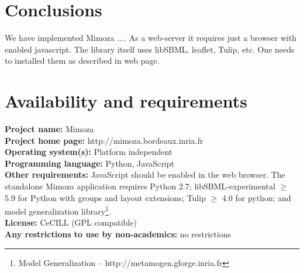 \documentclass{bmcart}
\begin{document}

\section*{Conclusions}
We have implemented Mimoza .... As a web-server it requires just a browser with enabled javascript. The library itself uses libSBML, leaflet, Tulip, etc. One needs to installed them as described in web page.


\section*{Availability and requirements}
\textbf{Project name:} Mimoza\\
\textbf{Project home page:} http://mimoza.bordeaux.inria.fr\\
\textbf{Operating system(s):} Platform independent\\
\textbf{Programming language:} Python, JavaScript\\
\textbf{Other requirements:} JavaScript should be enabled in the web browser. The standalone Mimoza application requires Python 2.7; libSBML-experimental $\geq$ 5.9 for Python with groups and layout extensions; Tulip $\geq$ 4.0 for python; and model generalization library\footnote{Model Generalization -- http://metamogen.gforge.inria.fr}.\\
\textbf{License:} CeCILL (GPL compatible)\\
\textbf{Any restrictions to use by non-academics:} no restrictions

\end{document}
